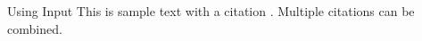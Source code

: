 

Using Input
\lipsum[1-4]
This is sample text with a citation \cite{barham2003xen}. Multiple citations \cite{barham2003xen,LIS} can be combined.